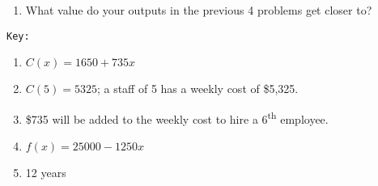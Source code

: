 \documentclass{article}
\newcounter{pset}
\begin{document}
\begin{enumerate}   \setcounter{enumi}{\value{pset}}
    \item What value do your outputs in the previous 4 problems get closer to?
\end{enumerate}


\vfill 

\dotfill \newline 
\texttt{Key:}

\begin{enumerate}
    \item $C(x) = 1650 + 735x$
    \item $C(5) = 5325$; a staff of 5 has a weekly cost of \$5,325.
    \item \$735 will be added to the weekly cost to hire a 6\textsuperscript{th} employee.
    \item $f(x) = 25000 - 1250x$
    \item 12 years
\end{enumerate}
\end{document}
